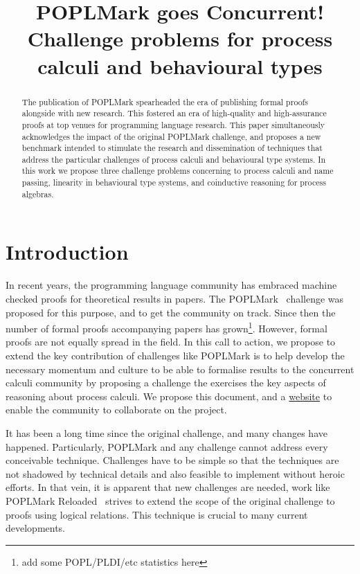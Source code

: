 \documentclass{article}
\begin{document}
\title{POPLMark goes Concurrent!\\Challenge problems for process calculi and behavioural types}

\maketitle

\begin{abstract}
  The publication of POPLMark spearheaded the era of publishing formal
  proofs alongside with new research. This fostered an era of
  high-quality and high-assurance proofs at top venues for programming
  language research. This paper simultaneously acknowledges the impact
  of the original POPLMark challenge, and proposes a new benchmark
  intended to stimulate the research and dissemination of techniques
  that address the particular challenges of process calculi and
  behavioural type systems. In this work we propose three challenge
  problems concerning to process calculi and name passing, linearity
  in behavioural type systems, and coinductive reasoning for process
  algebras.
\end{abstract}

\section{Introduction}

In recent years, the programming language community has embraced
machine checked proofs for theoretical results in papers. The
POPLMark~\cite{POPLMark} challenge was proposed for this purpose,
and to get the community on track. Since then the number of formal
proofs accompanying papers has grown\footnote{add some POPL/PLDI/etc
  statistics here}. However, formal proofs are not equally spread in
the field. In this call to action, we propose to extend the key
contribution of challenges like POPLMark is to help develop the
necessary momentum and culture to be able to formalise results to the
concurrent calculi community by proposing a challenge the exercises
the key aspects of reasoning about process calculi. We propose this
document, and a \href{https://concurrentbenchmark.github.io/}{website}
to enable the community to collaborate on the project.

It has been a long time since the original challenge, and many changes
have happened. Particularly, POPLMark and any challenge cannot address
every conceivable technique. Challenges have to be simple so that the
techniques are not shadowed by technical details and also feasible to
implement without heroic efforts. In that vein, it is apparent that
new challenges are needed, work like POPLMark
Reloaded~\cite{POPLMarkReloaded} strives to extend the scope of the
original challenge to proofs using logical relations. This technique
is crucial to many current developments.
\end{document}
